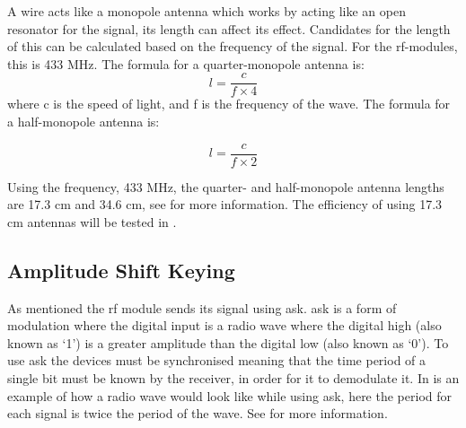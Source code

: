 A wire acts like a monopole antenna which works by acting like an open resonator for the signal, its length can affect its effect. 
Candidates for the length of this can be calculated based on the frequency of the signal.
For the \gls{rf}-modules, this is 433 MHz.
The formula for a quarter-monopole antenna is: 
\begin{equation} \label{QMA}
l = \frac{c}{f \times 4}
\end{equation}
where c is the speed of light, and f is the frequency of the wave.
The formula for a half-monopole antenna is: 

\begin{equation}
l = \frac{c}{f \times 2}
\end{equation}

\noindent
Using the frequency, 433 MHz, the quarter- and half-monopole antenna lengths are 17.3 cm and 34.6 cm, see \cite{AntennaLength} for more information.
The efficiency of using 17.3 cm antennas will be tested in .

\subsection{Amplitude Shift Keying}\label{subsub:ask}
As mentioned the \gls{rf} module sends its signal using \gls{ask}.
\gls{ask} is a form of modulation where the digital input is a radio wave where the digital high (also known as \enquote*{1}) is a greater amplitude than the digital low (also known as \enquote*{0}).
To use \gls{ask} the devices must be synchronised meaning that the time period of a single bit must be known by the receiver, in order for it to demodulate it. 
In  is an example of how a radio wave would look like while using \gls{ask}, here the period for each signal is twice the period of the wave. See \cite{ASKnFSK} for more information.  

